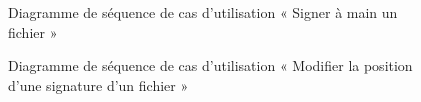 \begin{figure}[H]
  \centering
  \caption{Diagramme de séquence de cas d'utilisation « Signer à main un fichier   »}
  \label{fig:sequence_sign_by_hand}
\end{figure}
\begin{figure}[H]
  \centering
  \caption{Diagramme de séquence de cas d'utilisation « Modifier la position d'une signature d'un fichier »}
  \label{fig:sequence_move_signature}
\end{figure}

